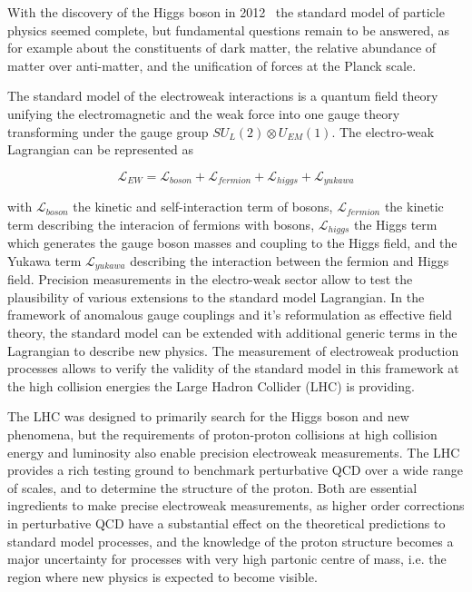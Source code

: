 \label{ss-intro-motivation}

With the discovery of the Higgs boson in 2012~\cite{Chatrchyan201230, Aad20121} 
the standard model of particle physics
seemed complete, but fundamental questions remain to be answered, as for example about the
constituents of dark matter, the relative abundance of matter over anti-matter, 
and the unification of forces at the Planck scale. 

The standard model of the electroweak interactions is a quantum field theory
unifying the electromagnetic and the weak force into one gauge theory transforming
under the gauge group $SU_L(2) \otimes U_{EM}(1)$. 
The electro-weak Lagrangian can be represented as 

$$ \mathcal{L}_{EW} = \mathcal{L}_{boson} + \mathcal{L}_{fermion} + \mathcal{L}_{higgs} + \mathcal{L}_{yukawa} $$

with $\mathcal{L}_{boson}$ the kinetic and self-interaction term of bosons,
$\mathcal{L}_{fermion}$ the kinetic term describing the interacion of fermions
with bosons, $\mathcal{L}_{higgs}$ the Higgs term which generates the gauge boson masses
and coupling to the Higgs field, and the Yukawa term $\mathcal{L}_{yukawa}$ describing
the interaction between the fermion and Higgs field. 
Precision measurements in the electro-weak sector allow to test the plausibility of 
various extensions to the standard model Lagrangian. In the framework of anomalous gauge couplings
and it's reformulation as effective field theory, the standard model can be extended
with additional generic terms in the Lagrangian to describe new physics. The 
measurement of electroweak production processes allows to verify the validity 
of the standard model in this framework at the high collision energies the Large Hadron Collider (LHC) 
is providing.

The LHC was designed to primarily search for the Higgs boson and
new phenomena, but the requirements of proton-proton collisions at high collision energy and 
luminosity also enable precision electroweak measurements. The LHC 
provides a rich testing ground to benchmark perturbative QCD over a wide range of scales, 
and to determine the structure of the proton. 
Both are essential ingredients to make precise electroweak measurements, as higher order
corrections in perturbative QCD have a substantial effect on the theoretical predictions to 
standard model processes, and the knowledge of the proton structure becomes a major uncertainty
for processes with very high partonic centre of mass, i.e. the region where new physics is expected
to become visible.

